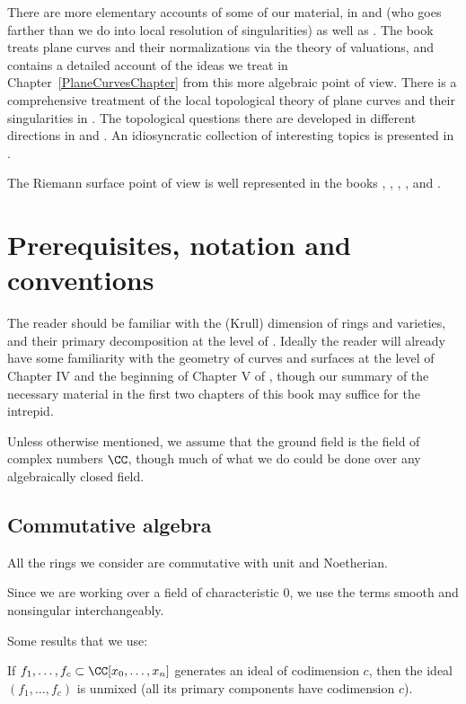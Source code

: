 There are more elementary accounts of some of our material, in \cite{Fulton1989} and \cite{Walker1978} (who goes farther than we do into local resolution of singularities) as well as \cite{Griffiths-curves}. The book \cite{Kunz} treats plane curves and their normalizations via the theory of valuations, and contains a detailed  account of the ideas we treat in Chapter~\ref{PlaneCurvesChapter} from this more algebraic point of view.  There is a comprehensive treatment of the local topological theory of plane curves and their singularities in \cite{Brieskorn1986}. The topological questions there are developed in different directions in \cite{MR0239612} %
 and \cite{MR817982}. %
 An  idiosyncratic collection of interesting topics is presented in \cite{Clemens-Scrapbook}.

 The Riemann surface point of view is well represented in the books \cite{Forster}, \cite{Gunning}, \cite{Gunning-2}, \cite{Kirwan}, and \cite{Miranda}. 


\section*{Prerequisites, notation and conventions}
The reader should be familiar with the 
(Krull)
dimension of rings and
%
%
varieties, and their 
primary decomposition 
at the level of
\cite{Atiyah-MacDonald}. Ideally the reader  will already have some
familiarity with the geometry of curves and surfaces 
at the level of 
Chapter IV and the beginning of Chapter V of
\cite{Hartshorne1977}, though our summary of the necessary material
in the first two chapters of this book may suffice for the intrepid.

Unless otherwise mentioned, we assume that the ground field is the field of complex numbers $\CC$, though much of what we do
could be done over any algebraically closed field.

\subsection*{Commutative algebra} 
All the rings we consider are commutative with unit and Noetherian.

Since we are working over  a field of characteristic 0, we use the
terms smooth and nonsingular interchangeably.

Some results that we use:
 \begin{theorem}\label{Lasker}
If $f_1,\dots, f_c \subset \CC[x_0,\dots, x_n]$ generates an ideal of codimension $c$, then 
the ideal $(f_1,\dots, f_c)$ is unmixed (all its primary components have codimension $c$).
%
\end{theorem}

